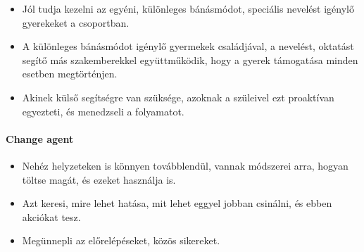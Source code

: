 \begin{itemize}

    \item
          Jól tudja kezelni az egyéni, különleges bánásmódot, speciális nevelést igénylő gyerekeket a csoportban.
    \item A különleges bánásmódot igénylő gyermekek családjával, a
      nevelést, oktatást segítő más szakemberekkel együttműködik, hogy
      a\linebreak
      gyerek támogatása minden esetben megtörténjen.
    \item
          Akinek külső segítségre van szüksége, azoknak a szüleivel ezt proaktívan egyezteti, és menedzseli a folyamatot.
\end{itemize}

\paragraph{Change agent}\label{change-agent}

\begin{itemize}

    \item
          Nehéz helyzeteken is könnyen továbblendül, vannak módszerei arra, hogyan töltse magát, és ezeket használja is.
    \item
          Azt keresi, mire lehet hatása, mit lehet eggyel jobban csinálni, és ebben akciókat tesz.
    \item
          Megünnepli az előrelépéseket, közös sikereket.
\end{itemize}


